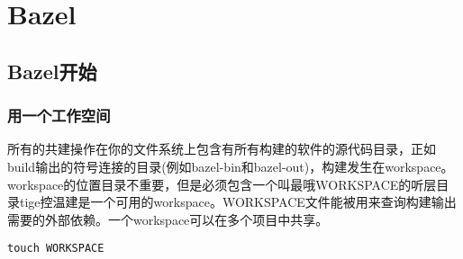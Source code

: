\chapter{Bazel}
\section{Bazel开始}
\subsection{用一个工作空间}
所有的共建操作在你的文件系统上包含有所有构建的软件的源代码目录，正如build输出的符号连接的目录(例如bazel-bin和bazel-out)，构建发生在workspace。workspace的位置目录不重要，但是必须包含一个叫最哦WORKSPACE的听层目录tige控温建是一个可用的workspace。WORKSPACE文件能被用来查询构建输出需要的外部依赖。一个workspace可以在多个项目中共享。
\begin{lstlisting}[frame =shadowbox ]
touch WORKSPACE
\end{lstlisting}
